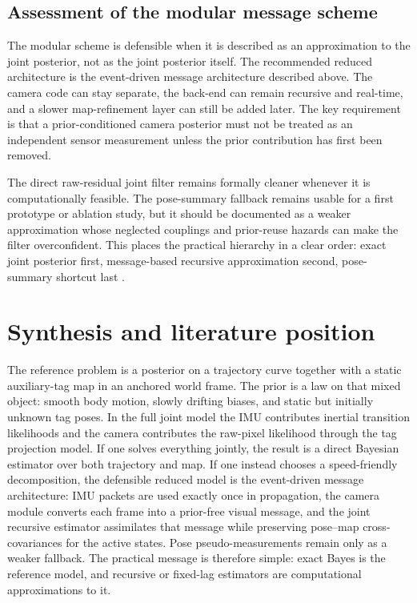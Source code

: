 \documentclass[11pt]{report}
\begin{document}
\subsection{Assessment of the modular message scheme}
The modular scheme is defensible when it is described as an approximation to the joint posterior, not as the joint posterior itself. The recommended reduced architecture is the event-driven message architecture described above. The camera code can stay separate, the back-end can remain recursive and real-time, and a slower map-refinement layer can still be added later. The key requirement is that a prior-conditioned camera posterior must not be treated as an independent sensor measurement unless the prior contribution has first been removed.

The direct raw-residual joint filter remains formally cleaner whenever it is computationally feasible. The pose-summary fallback remains usable for a first prototype or ablation study, but it should be documented as a weaker approximation whose neglected couplings and prior-reuse hazards can make the filter overconfident. This places the practical hierarchy in a clear order: exact joint posterior first, message-based recursive approximation second, pose-summary shortcut last \citep{mourikis2007msckf,leutenegger2015okvis,forster2017preintegration,kaess2012isam2,TagSLAM2019}.

\section{Synthesis and literature position}
The reference problem is a posterior on a trajectory curve together with a static auxiliary-tag map in an anchored world frame. The prior is a law on that mixed object: smooth body motion, slowly drifting biases, and static but initially unknown tag poses. In the full joint model the IMU contributes inertial transition likelihoods and the camera contributes the raw-pixel likelihood through the tag projection model. If one solves everything jointly, the result is a direct Bayesian estimator over both trajectory and map. If one instead chooses a speed-friendly decomposition, the defensible reduced model is the event-driven message architecture: IMU packets are used exactly once in propagation, the camera module converts each frame into a prior-free visual message, and the joint recursive estimator assimilates that message while preserving pose--map cross-covariances for the active states. Pose pseudo-measurements remain only as a weaker fallback. The practical message is therefore simple: exact Bayes is the reference model, and recursive or fixed-lag estimators are computational approximations to it.
\end{document}
